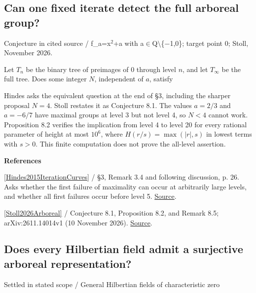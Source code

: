 \documentclass[11pt,a4paper,oneside,openany]{book}
\newcommand{\atlasdisplay}[1]{\par\begingroup\centering\vspace{3pt}\noindent\adjustbox{max width=\linewidth}{\(\displaystyle #1\)}\par\vspace{5pt}\endgroup}
\newenvironment{sources}{\par\smallskip\begingroup\footnotesize\color{atlasgray}\leftskip=10pt\setlength{\parskip}{2pt}}{\par\endgroup\smallskip}
\begin{document}
\subsection*{Can one fixed iterate detect the full arboreal group?}
{\small\sffamily\color{atlasgold}Conjecture in cited source / f\_\allowbreak{}a=x\ensuremath{{}^2}+a with a\ensuremath{\in}Q\ensuremath{\setminus}\{\ensuremath{-}1,0\}; target point 0; Stoll, November 2026.}\par\smallskip
\color{black} Let \(T_n\) be the binary tree of preimages of \(0\) through level \(n\), and let \(T_\infty\) be the full tree. Does some integer \(N\), independent of \(a\), satisfy\par

\atlasdisplay{\operatorname{Gal}(f_a^{\circ N}/\mathbb Q)=\operatorname{Aut}(T_N)\quad\Longrightarrow\quad G_\infty(f_a,0)=\operatorname{Aut}(T_\infty)?}
\color{black} Hindes asks the equivalent question at the end of §3, including the sharper proposal \(N=4\). Stoll restates it as Conjecture 8.1. The values \(a=2/3\) and \(a=-6/7\) have maximal groups at level 3 but not level 4, so \(N<4\) cannot work. Proposition 8.2 verifies the implication from level 4 to level 20 for every rational parameter of height at most \(10^6\), where \(H(r/s)=\max(|r|,s)\) in lowest terms with \(s>0\). This finite computation does not prove the all-level assertion.\par
\begin{sources}
\textbf{References}\par\smallskip
\noindent\hyperlink{ref:Hindes2015IterationCurves}{[Hindes2015IterationCurves]} / §3, Remark 3.4 and following discussion, p. 26. Asks whether the first failure of maximality can occur at arbitrarily large levels, and whether all first failures occur before level 5. \href{https://doi.org/10.4064/aa169-1-1}{Source}.\par
\noindent\hyperlink{ref:Stoll2026Arboreal}{[Stoll2026Arboreal]} / Conjecture 8.1, Proposition 8.2, and Remark 8.5; arXiv:2611.14014v1 (10 November 2026).  \href{https://arxiv.org/abs/2611.14014v1}{Source}.\par
\end{sources}\color{black}
\subsection*{Does every Hilbertian field admit a surjective arboreal representation?}
{\small\sffamily\color{atlasgold}Settled in stated scope / General Hilbertian fields of characteristic zero}\par\smallskip
\end{document}
